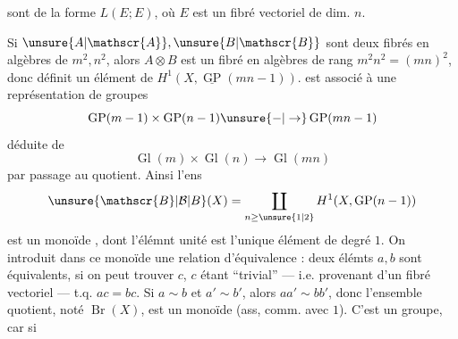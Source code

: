 sont de la forme $L(E;E)$, où $E$ est un fibré vectoriel de dim. $n$.

Si $\unsure{A|\mathscr{A}},\unsure{B|\mathscr{B}}$ sont deux fibrés en algèbres de  $m^2,n^2$, alors $A\otimes B$ est un fibré en algèbres de rang $m^2n^2=(mn)^2$, donc définit un élément de $H^1(X,\underline{\operatorname{GP}}(mn-1))$.  est associé à une représentation de groupes
\[
\operatorname{GP}(m-1)\times\operatorname{GP}(n-1)\unsure{-|\to}\operatorname{GP}(mn-1)
\]
déduite de
\[
\operatorname{Gl}(m)\times\operatorname{Gl}(n)\longrightarrow\operatorname{Gl}(mn)
\]
par passage au quotient. Ainsi l'ens
\[
\unsure{\mathscr{B}|\mathcal{B}|B}(X)=\coprod_{n\geq\unsure{1|2}}H^1(X,\operatorname{GP}(n-1))
\]
est un monoïde , dont l'élémnt unité est l'unique élément de degré $1$. On  introduit dans ce monoïde une relation d'équivalence : deux  élémts $a,b$ sont équivalents, si on peut trouver $c$, $c$ étant ``trivial'' --- i.e. provenant d'un fibré vectoriel --- t.q. $ac=bc$. Si $a\sim b$ et $a'\sim b'$, alors $aa'\sim bb'$, donc l'ensemble quotient, noté $\operatorname{Br}(X)$, est un monoïde  (ass, comm. avec $1$). C'est  un groupe, car si
